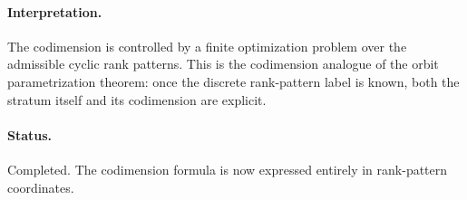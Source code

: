 \paragraph{Interpretation.}
The codimension is controlled by a finite optimization problem over the
admissible cyclic rank patterns. This is the codimension analogue of the orbit
parametrization theorem: once the discrete rank-pattern label is known, both the
stratum itself and its codimension are explicit.

\paragraph{Status.}
Completed. The codimension formula is now expressed entirely in rank-pattern
coordinates.
